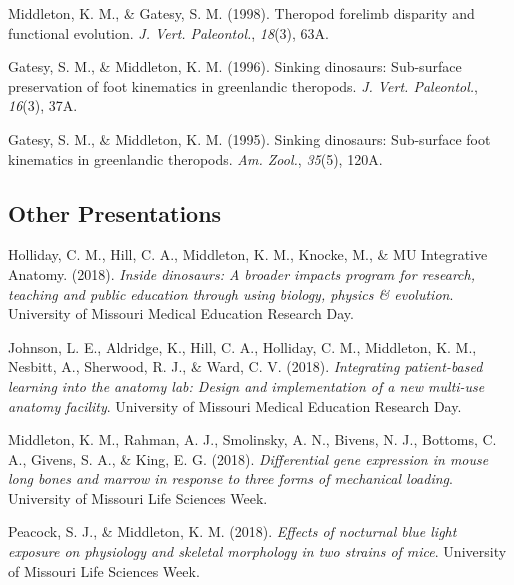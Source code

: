 \documentclass[11pt, a4paper]{awesome-cv}
\begin{document}
\leavevmode\hypertarget{ref-middleton_theropod_1998}{}%
Middleton, K. M., \& Gatesy, S. M. (1998). Theropod forelimb disparity
and functional evolution. \emph{J. Vert. Paleontol.}, \emph{18}(3), 63A.

\leavevmode\hypertarget{ref-gatesy_sinking_1996}{}%
Gatesy, S. M., \& Middleton, K. M. (1996). Sinking dinosaurs:
Sub-surface preservation of foot kinematics in greenlandic theropods.
\emph{J. Vert. Paleontol.}, \emph{16}(3), 37A.

\leavevmode\hypertarget{ref-gatesy_sinking_1995}{}%
Gatesy, S. M., \& Middleton, K. M. (1995). Sinking dinosaurs:
Sub-surface foot kinematics in greenlandic theropods. \emph{Am. Zool.},
\emph{35}(5), 120A.

\endgroup

\hypertarget{other-presentations}{%
\subsection{Other Presentations}\label{other-presentations}}

\begingroup
\setlength{\parindent}{-0.5in}
\setlength{\leftskip}{0.5in}

\hypertarget{refs_other}{}
\leavevmode\hypertarget{ref-Holliday2018-ei}{}%
Holliday, C. M., Hill, C. A., Middleton, K. M., Knocke, M., \& MU
Integrative Anatomy. (2018). \emph{Inside dinosaurs: A broader impacts
program for research, teaching and public education through using
biology, physics \& evolution}. University of Missouri Medical Education
Research Day.

\leavevmode\hypertarget{ref-Johnson2018-mb}{}%
Johnson, L. E., Aldridge, K., Hill, C. A., Holliday, C. M., Middleton,
K. M., Nesbitt, A., Sherwood, R. J., \& Ward, C. V. (2018).
\emph{Integrating patient-based learning into the anatomy lab: Design
and implementation of a new multi-use anatomy facility}. University of
Missouri Medical Education Research Day.

\leavevmode\hypertarget{ref-Middleton2018-rt}{}%
Middleton, K. M., Rahman, A. J., Smolinsky, A. N., Bivens, N. J.,
Bottoms, C. A., Givens, S. A., \& King, E. G. (2018). \emph{Differential
gene expression in mouse long bones and marrow in response to three
forms of mechanical loading}. University of Missouri Life Sciences Week.

\leavevmode\hypertarget{ref-Peacock2018-hs}{}%
Peacock, S. J., \& Middleton, K. M. (2018). \emph{Effects of nocturnal
blue light exposure on physiology and skeletal morphology in two strains
of mice}. University of Missouri Life Sciences Week.
\end{document}
